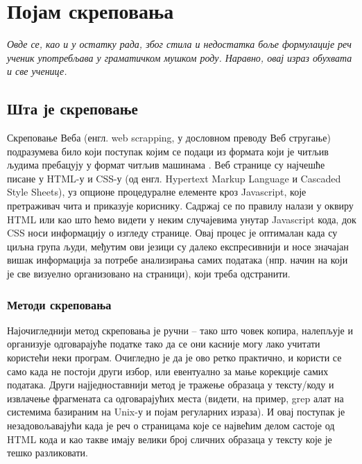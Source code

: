\chapter{Појам скреповања}\label{ch:\thechapter}
\vspace*{-8mm}
\textit{Овде се, као и у остатку рада, због стила и недостатка боље формулације реч ученик употребљава у граматичком мушком роду. Наравно, овај израз обухвата и све ученице.} %
\vspace{5mm}

\section{Шта је скреповање}

Скреповање Веба (енгл. web scrapping, у дословном преводу Веб стругање) подразумева било који поступак којим се подаци из формата који је читљив људима пребацују у формат читљив машинама \citep{boeing2017new}. Веб странице су најчешће писане у HTML-у и CSS-у (од енгл. Hypertext Markup Language и Cascaded Style Sheets), уз опционе процедуралне елементе кроз Javascript, које претраживач чита и приказује кориснику. Садржај се по правилу налази у оквиру HTML или као што ћемо видети у неким случајевима унутар Javascript кода, док CSS носи информацију о изгледу странице. Овај процес је оптималан када су циљна група људи, међутим ови језици су далеко експресивнији и носе значајан вишак информација за потребе анализирања самих података (нпр. начин на који је све визуелно организовано на страници), који треба одстранити. 

\subsection{Методи скреповања}

Најочигледнији метод скреповања је ручни -- тако што човек копира, налепљује и организује одговарајуће податке тако да се они касније могу лако учитати користећи неки програм. Очигледно је да је ово ретко практично, и користи се само када не постоји други избор, или евентуално за мање корекције самих података. Други најједноставнији метод је тражење образаца у тексту/коду и извлачење фрагмената са одговарајућих места (видети, на пример, grep алат на системима базираним на Unix-у и појам регуларних израза). И овај поступак је незадовољавајући када је реч о страницама које се највећим делом састоје од HTML кода и као такве имају велики број сличних образаца у тексту које је тешко разликовати. 

